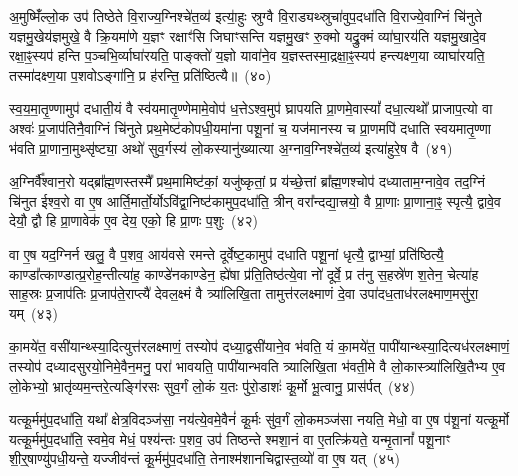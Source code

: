 अ॒मुष्मिँ॑ल्लो॒क उप॑ तिष्ठेते वि॒राज्य॒ग्निश्चे॑त॒व्य॑ इत्या॒॑हुः स्रुग्वै वि॒राड्यथ्स्रुचा॑वुप॒दधा॑ति वि॒राज्ये॒वाग्निं चि॑नुते यज्ञमु॒खेय॑ज्ञमुखे॒ वै क्रि॒यमा॑णे य॒ज्ञꣳ रक्षाꣳ॑सि जिघाꣳसन्ति यज्ञमु॒खꣳ रु॒क्मो यद्रु॒क्मं व्या॑घा॒रय॑ति यज्ञमु॒खादे॒व रक्षा॒ꣴ॒स्यप॑ हन्ति प॒ञ्चभि॒र्व्याघा॑रयति॒ पाङ्क्तो॑ य॒ज्ञो यावा॑ने॒व य॒ज्ञस्तस्मा॒द्रक्षा॒ꣴ॒स्यप॑ हन्त्यक्ष्ण॒या व्याघा॑रयति॒ तस्मा॑दक्ष्ण॒या प॒शवो\-ऽङ्गा॑नि॒ प्र ह॑रन्ति॒ प्रति॑ष्ठित्यै॥~(४०)

{\anuvakamend[{वन॒स्पत॑यो दक्षिण॒तो ध॑त्त एन॒न्तस्मा॑दक्ष्ण॒या पञ्च॑ च}]}%

स्व॒य॒मा॒तृ॒ण्णामुप॑ दधाती॒यं वै स्व॑यमातृ॒ण्णेमामे॒वोप॑ ध॒त्ते\-ऽश्व॒मुप॑ घ्रापयति प्रा॒णमे॒वास्यां᳚ दधा॒त्यथो᳚ प्राजाप॒त्यो वा अश्वः॑ प्र॒जा\-प॑तिनै॒वाग्निं चि॑नुते प्रथ॒मेष्ट॑कोपधी॒यमा॑ना पशू॒नां च॒ यज॑मानस्य च प्रा॒णमपि॑ दधाति स्वयमातृ॒ण्णा भ॑वति प्रा॒णाना॒मुथ्सृ॑ष्ट्या॒ अथो॑ सुव॒र्गस्य॑ लो॒कस्यानु॑ख्यात्या अ॒ग्नाव॒ग्निश्चे॑त॒व्य॑ इत्या॑हुरे॒ष वै~(४१)

अ॒ग्निर्वै᳚श्वान॒रो यद्ब्रा᳚ह्म॒णस्तस्मै᳚ प्रथ॒मामिष्ट॑कां॒ यजु॑ष्कृतां॒ प्र य॑च्छे॒त्तां ब्रा᳚ह्म॒णश्चोप॑ दध्याताम॒ग्नावे॒व तद॒ग्निं चि॑नुत ईश्व॒रो वा ए॒ष आर्ति॒मार्तो॒र्यो\-ऽवि॑द्वा॒निष्ट॑कामुप॒दधा॑ति॒ त्रीन् वरा᳚न्दद्या॒त्त्रयो॒ वै प्रा॒णाः प्रा॒णाना॒ꣴ॒ स्पृत्यै॒ द्वावे॒व देयौ॒ द्वौ हि प्रा॒णावेक॑ ए॒व देय॒ एको॒ हि प्रा॒णः प॒शुः~(४२)

वा ए॒ष यद॒ग्निर्न खलु॒ वै प॒शव॒ आय॑वसे रमन्ते दूर्वेष्ट॒कामुप॑ दधाति पशू॒नां धृत्यै॒ द्वाभ्यां॒ प्रति॑ष्ठित्यै॒ काण्डा᳚त्काण्डात्प्र॒रोह॒न्तीत्या॑ह॒ काण्डे॑नकाण्डेन॒ ह्ये॑षा प्र॑ति॒तिष्ठ॑त्ये॒वा नो॑ दूर्वे॒ प्र त॑नु स॒हस्रे॑ण श॒तेन॒ चेत्या॑ह साह॒स्रः प्र॒जा\-प॑तिः प्र॒जा\-प॑ते॒राप्त्यै॑ देवल॒क्ष्मं वै त्र्या॑लिखि॒ता तामुत्त॑रलक्ष्माणं दे॒वा उपा॑दध॒ताध॑रलक्ष्माण॒मसु॑रा॒ यम्~(४३)

का॒मये॑त॒ वसी॑यान्थ्स्या॒दित्युत्त॑रलक्ष्माणं॒ तस्योप॑ दध्या॒द्वसी॑याने॒व भ॑वति॒ यं का॒मये॑त॒ पापी॑यान्थ्स्या॒दित्यध॑र\-लक्ष्माणं॒ तस्योप॑ दध्यादसुरयो॒निमे॒वैन॒मनु॒ परा॑ भावयति॒ पापी॑यान्भवति त्र्यालिखि॒ता भ॑वती॒मे वै लो॒का\-स्त्र्या॑लिखि॒तैभ्य ए॒व लो॒केभ्यो॒ भ्रातृ॑व्यम॒न्तरे॒त्यङ्गि॑रसः सुव॒र्गं लो॒कं य॒तः पु॑रो॒डाशः॑ कू॒र्मो भू॒त्वानु॒ प्रास॑र्पत्~(४४)

यत्कू॒र्ममु॑प॒दधा॑ति॒ यथा᳚ क्षेत्र॒विदञ्ज॑सा॒ नय॑त्ये॒वमे॒वैनं॑ कू॒र्मः सु॑व॒र्गं लो॒कमञ्ज॑सा नयति॒ मेधो॒ वा ए॒ष प॑शू॒नां यत्कू॒र्मो यत्कू॒र्ममु॑प॒दधा॑ति॒ स्वमे॒व मेधं॒ पश्य॑न्तः प॒शव॒ उप॑ तिष्ठन्ते श्मशा॒नं वा ए॒तत्क्रि॑यते॒ यन्मृ॒तानां᳚ पशू॒नाꣳ शी॒र्॒\mbox{}षाण्यु॑पधी॒यन्ते॒ यज्जीव॑न्तं कू॒र्ममु॑प॒दधा॑ति॒ तेनाश्म॑शानचिद्वास्त॒व्यो॑ वा ए॒ष यत्~(४५)


